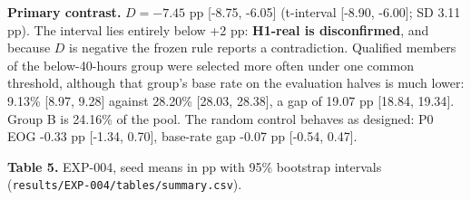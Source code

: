 \documentclass[
]{article}
\begin{document}
\textbf{Primary contrast.} \(D = -7.45\) pp {[}-8.75, -6.05{]}
(t-interval {[}-8.90, -6.00{]}; SD 3.11 pp). The interval lies entirely
below +2 pp: \textbf{H1-real is disconfirmed}, and because \(D\) is
negative the frozen rule reports a contradiction. Qualified members of
the below-40-hours group were selected more often under one common
threshold, although that group's base rate on the evaluation halves is
much lower: 9.13\% {[}8.97, 9.28{]} against 28.20\% {[}28.03, 28.38{]},
a gap of 19.07 pp {[}18.84, 19.34{]}. Group B is 24.16\% of the pool.
The random control behaves as designed: P0 EOG -0.33 pp {[}-1.34,
0.70{]}, base-rate gap -0.07 pp {[}-0.54, 0.47{]}.

\textbf{Table 5.} EXP-004, seed means in pp with 95\% bootstrap
intervals (\texttt{results/EXP-004/tables/summary.csv}).
\end{document}
